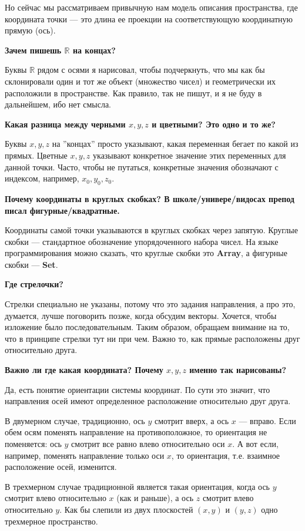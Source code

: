 \documentclass[a4paper,12pt]{article}
\newcommand{\R}{\mathbb{R}}
\newcounter{z-counter}
\newcounter{th-counter}
\begin{document}
Но сейчас мы рассматриваем привычную нам модель описания пространства, где координата точки --- это длина ее проекции на соответствующую координатную прямую (ось).

\noindent\textbf{Зачем пишешь $\R$ на концах?}

Буквы $\R$ рядом с осями я нарисовал, чтобы подчеркнуть, что мы как бы склонировали один и тот же объект (множество чисел) и геометрически их расположили в пространстве. Как правило, так не пишут, и я не буду в дальнейшем, ибо нет смысла.

\noindent\textbf{Какая разница между черными $x,y,z$ и цветными? Это одно и то же?}

Буквы $x, y, z$ на ''концах'' просто указывают, какая переменная бегает по какой из прямых. Цветные $x,y,z$ указывают конкретное значение этих переменных для данной точки. Часто, чтобы не путаться, конкретные значения обозначают с индексом, например, $x_0, y_0, z_0$.

\noindent\textbf{Почему координаты в круглых скобках? В школе/универе/видосах препод писал фигурные/квадратные.}

Координаты самой точки указываются в круглых скобках через запятую. Круглые скобки --- стандартное обозначение упорядоченного набора чисел. На языке программирования можно сказать, что круглые скобки это \textbf{Array}, а фигурные скобки --- \textbf{Set}.

\noindent\textbf{Где стрелочки?}

Стрелки специально не указаны, потому что это задания направления, а про это, думается, лучше поговорить позже, когда обсудим векторы. Хочется, чтобы изложение было последовательным. Таким образом, обращаем внимание на то, что в принципе стрелки тут ни при чем. Важно то, как прямые расположены друг относительно друга.

\noindent\textbf{Важно ли где какая координата? Почему $x,y,z$ именно так нарисованы?}

Да, есть понятие ориентации системы координат. По сути это значит, что направления осей имеют определенное расположение относительно друг друга.

В двумерном случае, традиционно, ось $y$ смотрит вверх, а ось $x$ --- вправо. Если обем осям поменять направление на противоположное, то ориентация не поменяется: ось $y$ смотрит все равно влево относительно оси $x$. А вот если, например, поменять направление только оси $x$, то ориентация, т.е. взаимное расположение осей, изменится.

В трехмерном случае традиционной является такая ориентация, когда ось $y$ смотрит влево относительно $x$ (как и раньше), а ось $z$ смотрит влево относительно $y$. Как бы слепили из двух плоскостей $(x,y)$ и $(y,z)$ одно трехмерное пространство.
\end{document}

